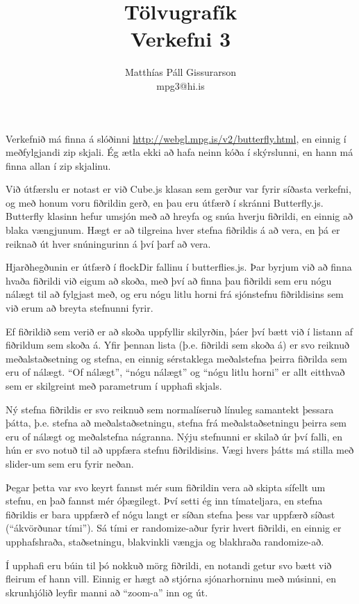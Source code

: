 \documentclass[12pt]{article}
\title{Tölvugrafík\\Verkefni 3}
\author{Matthías Páll Gissurarson\\mpg3@hi.is}
\begin{document}
\maketitle

Verkefnið má finna á slóðinni \url{http://webgl.mpg.is/v2/butterfly.html}, en einnig í meðfylgjandi zip skjali. Ég ætla ekki að hafa neinn kóða í skýrslunni, en hann má finna allan í zip skjalinu.

Við útfærslu er notast er við Cube.js klasan sem gerður var fyrir síðasta verkefni, og með honum voru fiðrildin gerð, en þau eru útfærð í skránni Butterfly.js.
Butterfly klasinn hefur umsjón með að hreyfa og snúa hverju fiðrildi, en einnig að blaka vængjunum. Hægt er að tilgreina hver stefna fiðrildis á að vera,
en þá er reiknað út hver snúningurinn á því þarf að vera.


Hjarðhegðunin er útfærð í flockDir fallinu í butterflies.js.
Þar byrjum við að finna hvaða fiðrildi við eigum að skoða, með því
að finna þau fiðrildi sem eru nógu nálægt til að fylgjast með, og eru nógu litlu
horni frá sjónstefnu fiðrildisins sem við erum að breyta stefnunni fyrir.

Ef fiðrildið sem verið er að skoða uppfyllir skilyrðin, þáer því bætt við í listann af fiðrildum sem skoða á.
Yfir þennan lista (þ.e. fiðrildi sem skoða á) er svo reiknuð meðalstaðsetning og stefna, en einnig sérstaklega meðalstefna þeirra
fiðrilda sem eru of nálægt.
``Of nálægt'', ``nógu nálægt'' og ``nógu litlu horni'' er allt eitthvað sem er skilgreint með parametrum í upphafi skjals.

Ný stefna fiðrildis er svo reiknuð sem normalíseruð línuleg samantekt þessara þátta, þ.e. stefna að meðalstaðsetningu, stefna frá meðalstaðsetningu þeirra sem eru of nálægt og meðalstefna nágranna. Nýju stefnunni er skilað úr því falli, en hún er svo notuð til að uppfæra stefnu fiðrildisins. Vægi hvers þátts má stilla með slider-um sem eru fyrir neðan.

Þegar þetta var svo keyrt fannst mér sum fiðrildin vera að skipta sífellt um stefnu,
en það fannst mér óþægilegt. Því setti ég inn tímateljara, en stefna fiðrildis er bara
uppfærð ef nógu langt er síðan stefna þess var uppfærð síðast (``ákvörðunar tími'').
Sá tími er randomize-aður fyrir hvert fiðrildi, en einnig er upphafshraða, staðsetningu,
blakvinkli vængja og blakhraða randomize-að.

Í upphafi eru búin til þó nokkuð mörg fiðrildi, en notandi getur svo bætt við fleirum ef hann vill.
Einnig er hægt að stjórna sjónarhorninu með músinni, en skrunhjólið leyfir manni að ``zoom-a'' inn og út.
\end{document}
